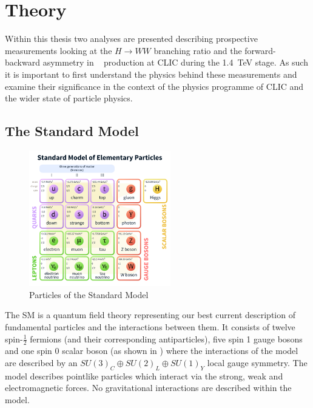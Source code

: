 \chapter{Theory}
\label{theory}

Within this thesis two analyses are presented describing prospective measurements looking at the $H\rightarrow WW$ branching ratio and the forward-backward asymmetry in \ttbar~ production at CLIC during the 1.4~TeV stage. As such it is important to first understand the physics behind these measurements and examine their significance in the context of the physics programme of CLIC and the wider state of particle physics.


\section{The Standard Model}

\begin{figure}
  \centering
  \includegraphics[width=0.55\textwidth,keepaspectratio]{Theory/fig/smparticles.png}
  \caption[Particles of the Standard Model]{Particles of the Standard Model \cite{wiki:xxx}}
  \label{fig:smparticles}
\end{figure}

The \ac{SM} is a quantum field theory representing our best current description of fundamental particles and the interactions between them. It consists of twelve spin-$\frac{1}{2}$ fermions (and their corresponding antiparticles), five spin 1 gauge bosons and one spin 0 scalar boson (as shown in ) where the interactions of the model are described by an $SU(3)_{C}\oplus SU(2)_{L}\oplus SU(1)_{Y}$ local gauge symmetry. The model describes pointlike particles which interact via the strong, weak and electromagnetic forces. No gravitational interactions are described within the model.

